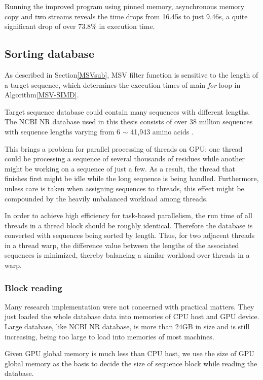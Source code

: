 Running the improved program using pinned memory, asynchronous memory copy and two streams reveals the time drops from 16.45s to just 9.46s, a quite significant drop of over 73.8\% in execution time.

\subsection{Sorting database}
\label{dbsort}
As described in Section\ref{MSVsub}, MSV filter function is sensitive to the length of a target sequence, which determines the execution times of main \emph{for} loop in Algorithm\ref{MSV-SIMD}. 

Target sequence database could contain many sequences with different lengths. The NCBI NR database used in this thesis consists of over 38 million sequences with sequence lengths varying from 6 $\sim$ 41,943 amino acids \citep{NCBI}.

This brings a problem for parallel processing of threads on GPU: one thread could be processing a sequence of several thousands of residues while another might be working on a sequence of just a few. As a result, the thread that finishes first might be idle while the long sequence is being handled. Furthermore, unless care is taken when assigning sequences to threads, this effect might be compounded by the heavily unbalanced workload among threads.

In order to achieve high efficiency for task-based parallelism, the run time of all threads in a thread block should be roughly identical. Therefore the database is converted with sequences being sorted by length. Thus, for two adjacent threads in a thread warp, the difference value between the lengths of the associated sequences is minimized, thereby balancing a similar workload over threads in a warp.

\subsubsection*{Block reading}
Many research implementation were not concerned with practical matters. They just loaded the whole database data into memories of CPU host and GPU device. Large database, like NCBI NR database, is more than 24GB in size and is still increasing, being too large to load into memories of most machines.

Given GPU global memory is much less than CPU host, we use the size of GPU global memory as the basis to decide the size of sequence block while reading the database.

